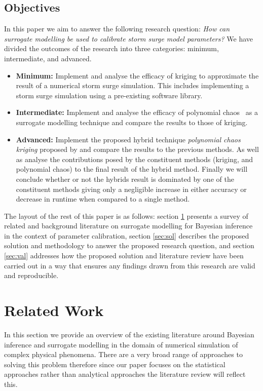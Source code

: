 \documentclass[12pt,a4paper]{article}
\begin{document}
\subsection{Objectives}
\noindent
In this paper we aim to answer the following research question: \textit{How can surrogate modelling be used to calibrate storm surge model parameters?} We have divided the outcomes of the research into three categories: minimum, intermediate, and advanced.
\begin{itemize}
	\item
	\textbf{Minimum: } Implement and analyse the efficacy of kriging to approximate the result of a numerical storm surge simulation. This includes implementing a storm surge simulation using a pre-existing software library.
	\item
	\textbf{Intermediate:} Implement and analyse the efficacy of polynomial chaos~\cite{xiu} as a surrogate modelling technique and compare the results to those of kriging.
	\item
	\textbf{Advanced:} Implement the proposed hybrid technique \textit{polynomial chaos kriging} proposed by  and compare the results to the previous methods. As well as analyse the contributions posed by the constituent methods (kriging, and polynomial chaos) to the final result of the hybrid method. Finally we will conclude whether or not the hybrids result is dominated by one of the constituent methods giving only a negligible increase in either accuracy or decrease in runtime when compared to a single method.
\end{itemize}

The layout of the rest of this paper is as follows: section \ref{sec:lit} presents a survey of related and background literature on surrogate modelling for Bayesian inference in the context of parameter calibration, section \ref{sec:sol} describes the proposed solution and methodology to answer the proposed research question, and section \ref{sec:val} addresses how the proposed solution and literature review have been carried out in a way that ensures any findings drawn from this research are valid and reproducible.

\section{Related Work} \label{sec:lit}
\noindent
In this section we provide an overview of the existing literature around Bayesian inference and surrogate modelling in the domain of numerical simulation of complex physical phenomena. There are a very broad range of approaches to solving this problem therefore since our paper focuses on the statistical approaches rather than analytical approaches the literature review will reflect this.
\end{document}
